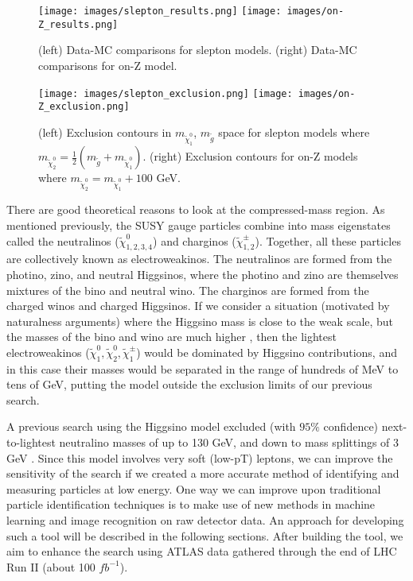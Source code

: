 \begin{figure}[t]
    \centering
    \texttt{[image: images/slepton\_results.png]}
    \texttt{[image: images/on-Z\_results.png]}
    \caption{(left) Data-MC comparisons for slepton models. (right) Data-MC comparisons for on-Z model.}
    \label{results}
\end{figure}

\begin{figure}[t]
    \centering
    \texttt{[image: images/slepton\_exclusion.png]}
    \texttt{[image: images/on-Z\_exclusion.png]}
    \caption{(left) Exclusion contours in $m_{\tilde{\chi}_1^0}$, $m_{\tilde{g}}$ space for slepton models where $m_{\tilde{\chi}_2^0} = \frac{1}{2}(m_{\tilde{g}} + m_{\tilde{\chi}_1^0})$. (right) Exclusion contours for on-Z models where $m_{\tilde{\chi}_2^0} = m_{\tilde{\chi}_1^0} + 100$ GeV.}
    \label{exclusion}
\end{figure}

There are good theoretical reasons to look at the compressed-mass region. As mentioned previously, the SUSY gauge particles combine into mass eigenstates called the neutralinos ($\tilde{\chi}^0_{1,2,3,4}$) and charginos ($\tilde{\chi}^\pm_{1,2}$). Together, all these particles are collectively known as electroweakinos. The neutralinos are formed from the photino, zino, and neutral Higgsinos, where the photino and zino are themselves mixtures of the bino and neutral wino. The charginos are formed from the charged winos and charged Higgsinos. If we consider a situation (motivated by naturalness arguments) where the Higgsino mass is close to the weak scale, but the masses of the bino and wino are much higher \cite{Higgsino}, then the lightest electroweakinos ($\tilde{\chi}^0_1, \tilde{\chi}^0_2, \tilde{\chi}^\pm_1$) would be dominated by Higgsino contributions, and in this case their masses would be separated in the range of hundreds of MeV to tens of GeV, putting the model outside the exclusion limits of our previous search.

A previous search using the Higgsino model excluded (with $95\%$ confidence) next-to-lightest neutralino masses of up to 130 GeV, and down to mass splittings of 3 GeV \cite{Higgsino}. Since this model involves very soft (low-pT) leptons, we can improve the sensitivity of the search if we created a more accurate method of identifying and measuring particles at low energy. One way we can improve upon traditional particle identification techniques is to make use of new methods in machine learning and image recognition on raw detector data. An approach for developing such a tool will be described in the following sections. After building the tool, we aim to enhance the search using ATLAS data gathered through the end of LHC Run II (about 100 $fb^{-1}$).
